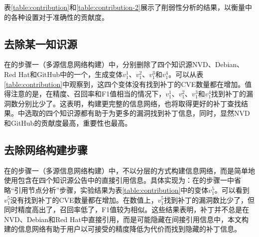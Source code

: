 表\ref{table:contribution}和\ref{table:contribution-2}展示了削弱性分析的结果，以衡量\tool 中的各种设置对于准确性的贡献度。

\subsection{去除某一知识源} 
在\tool 的步骤一（多源信息网络构建）中，分别删除了四个知识源NVD、Debian、Red Hat和GitHub中的一个，生成变体$v_1^1$、$v_1^2$、$v_1^3$和$v_1^4$。可以从表\ref{table:contribution}中观察到，这四个变体没有找到补丁的CVE数量都在增加。值得注意的是，在精度、召回率和F1值相当的情况下，$v_1^1$、$v_1^2$、$v_1^3$和$v_1^4$找到补丁的漏洞数分别比\tool 少了。这表明，构建更完整的信息网络，也将取得更好的补丁查找结果。\tool 中选取的四个知识源都有助于为更多的漏洞找到补丁信息，同时，显然NVD和GitHub的贡献度最高，重要性也最高。

\subsection{去除网络构建步骤}
在\tool 的步骤一（多源信息网络构建）中，不以分层的方式构建信息网络，而是简单地使用包含在四个知识源公告中的直接引用信息。具体实现为：在\tool 的步骤一中省略“引用节点分析”步骤，实验结果为表\ref{table:contribution}中的变体$v_1^5$。可以看到$v_1^5$没有找到补丁的CVE数量都在增加。在数值上，$v_1^5$找到补丁的漏洞数比\tool 少了，但同时精度高出了，召回率低了，F1值较为相似。这些结果表明，补丁并不总是在NVD、Debian和Red Hat中直接引用，而是可能隐藏在间接引用信息中，本文构建的信息网络有助于用户以可接受的精度降低为代价而找到隐藏的补丁信息。


